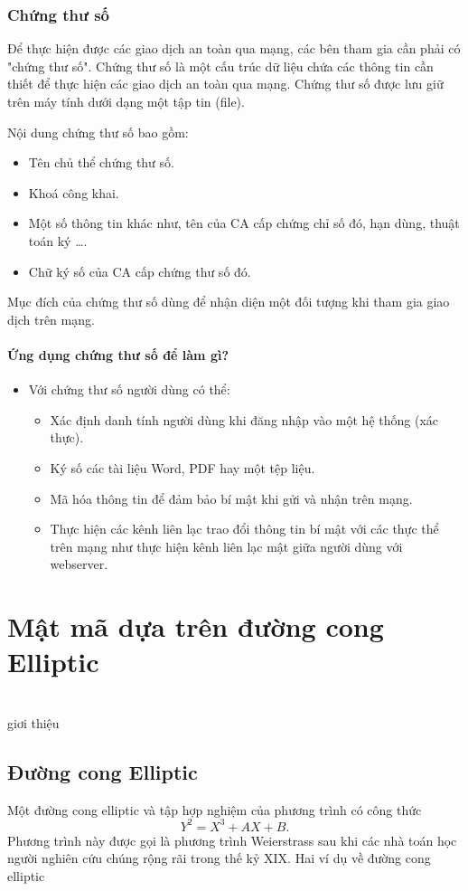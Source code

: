 \documentclass[a4paper,12pt]{report}
\begin{document}
\subsection*{Chứng thư số}
Để thực hiện được các giao dịch an toàn qua mạng, các bên tham gia cần phải có "chứng thư số". Chứng thư số là một cấu trúc dữ liệu chứa các thông tin cần thiết để thực hiện các giao dịch an toàn qua mạng. Chứng thư số được lưu giữ trên máy tính dưới dạng một tập tin (file).

Nội dung chứng thư số bao gồm:
\begin{itemize}
\item Tên chủ thể chứng thư số.
\item Khoá công khai.
\item Một số thông tin khác như, tên của CA cấp chứng chỉ số đó, hạn dùng, thuật toán ký \ldots.
\item Chữ ký số của CA cấp chứng thư số đó.
\end{itemize}

Mục đích của chứng thư số dùng để nhận diện một đối tượng khi tham gia giao dịch trên mạng.

\subsubsection{Ứng dụng chứng thư số để làm gì?}
\begin{itemize}
\item Với chứng thư số người dùng có thể:
\begin{itemize}
\item Xác định danh tính người dùng khi đăng nhập vào một hệ thống (xác thực).
\item Ký số các tài liệu Word, PDF hay một tệp liệu.
\item Mã hóa thông tin để đảm bảo bí mật khi gửi và nhận trên mạng.
\item Thực hiện các kênh liên lạc trao đổi thông tin bí mật với các thực thể trên mạng như thực hiện kênh liên lạc mật giữa người dùng với webserver.
\end{itemize}
\end{itemize}
\chapter{Mật mã dựa trên đường cong Elliptic}

\\ giơi thiệu 
\section{Đường cong Elliptic}
Một đường cong elliptic và tập hợp nghiệm của phương trình có công thức
\begin{displaymath}
Y^2 = X^3 + AX + B.
\end{displaymath}
Phương trình này được gọi là phương trình Weierstrass sau khi các nhà toán học người nghiên cứu chúng rộng rãi trong thế kỷ XIX. Hai ví dụ về đường cong elliptic
\end{document}
